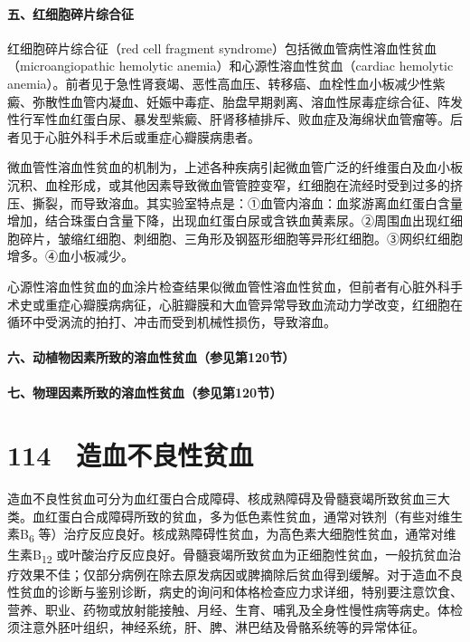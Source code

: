 \paragraph{五、红细胞碎片综合征}

红细胞碎片综合征（red cell fragment
syndrome）包括微血管病性溶血性贫血（microangiopathic hemolytic
anemia）和心源性溶血性贫血（cardiac hemolytic
anemia）。前者见于急性肾衰竭、恶性高血压、转移癌、血栓性血小板减少性紫癜、弥散性血管内凝血、妊娠中毒症、胎盘早期剥离、溶血性尿毒症综合征、阵发性行军性血红蛋白尿、暴发型紫癜、肝肾移植排斥、败血症及海绵状血管瘤等。后者见于心脏外科手术后或重症心瓣膜病患者。

微血管性溶血性贫血的机制为，上述各种疾病引起微血管广泛的纤维蛋白及血小板沉积、血栓形成，或其他因素导致微血管管腔变窄，红细胞在流经时受到过多的挤压、撕裂，而导致溶血。其实验室特点是：①血管内溶血：血浆游离血红蛋白含量增加，结合珠蛋白含量下降，出现血红蛋白尿或含铁血黄素尿。②周围血出现红细胞碎片，皱缩红细胞、刺细胞、三角形及钢盔形细胞等异形红细胞。③网织红细胞增多。④血小板减少。

心源性溶血性贫血的血涂片检查结果似微血管性溶血性贫血，但前者有心脏外科手术史或重症心瓣膜病病征，心脏瓣膜和大血管异常导致血流动力学改变，红细胞在循环中受涡流的拍打、冲击而受到机械性损伤，导致溶血。

\paragraph{六、动植物因素所致的溶血性贫血（参见第120节）}

\paragraph{七、物理因素所致的溶血性贫血（参见第120节）}

\protect\hypertarget{text00261.html}{}{}

\section{114　造血不良性贫血}

造血不良性贫血可分为血红蛋白合成障碍、核成熟障碍及骨髓衰竭所致贫血三大类。血红蛋白合成障碍所致的贫血，多为低色素性贫血，通常对铁剂（有些对维生素B\textsubscript{6}
等）治疗反应良好。核成熟障碍性贫血，为高色素大细胞性贫血，通常对维生素B\textsubscript{12}
或叶酸治疗反应良好。骨髓衰竭所致贫血为正细胞性贫血，一般抗贫血治疗效果不佳；仅部分病例在除去原发病因或脾摘除后贫血得到缓解。对于造血不良性贫血的诊断与鉴别诊断，病史的询问和体格检查应力求详细，特别要注意饮食、营养、职业、药物或放射能接触、月经、生育、哺乳及全身性慢性病等病史。体检须注意外胚叶组织，神经系统，肝、脾、淋巴结及骨骼系统等的异常体征。

